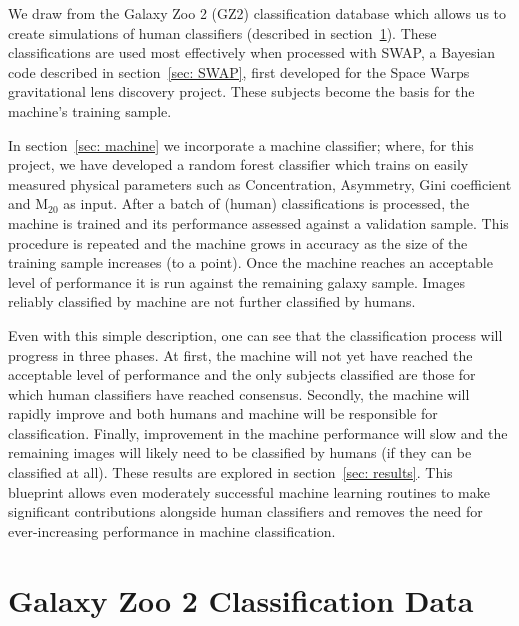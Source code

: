\documentclass[twocolumn]{aastex6}
\begin{document}
We draw from the Galaxy Zoo 2 (GZ2) classification database which allows us to 
 create simulations of human classifiers (described in section~\ref{sec: data}).
These classifications are used most effectively when processed with SWAP, 
a Bayesian code described in  section~\ref{sec: SWAP}, first developed for the 
Space Warps gravitational lens discovery project. 
These subjects become the basis for the machine's training sample. 

In section~\ref{sec: machine} we incorporate a machine classifier; where, for this
project, we have developed a random forest classifier which trains on easily measured 
physical parameters such as Concentration, Asymmetry, Gini coefficient and M$_{20}$ as input. 
After a batch of (human) classifications is processed,  the machine is trained and 
its performance assessed against a validation sample. This procedure is repeated and 
the machine grows in accuracy as the size of the training sample increases (to a point). 
Once the machine reaches an acceptable level of performance it is run against the 
remaining galaxy sample. Images reliably classified by machine are not further classified by humans.

Even with this simple description, one can see that the classification process 
will progress in three phases. At first, the machine will not yet have reached the 
acceptable level of performance and the only subjects classified
 are those for which human classifiers have reached consensus. 
Secondly, the machine will rapidly improve and both humans and machine will be 
responsible for classification. Finally, improvement in the machine performance 
will slow and the remaining images will likely need to be classified by humans (if they can be 
classified at all). These results are explored in section~\ref{sec: results}. 
This blueprint allows even moderately successful machine learning 
routines to make significant contributions alongside human classifiers and 
removes the need for ever-increasing performance in machine classification.



\section{Galaxy Zoo 2 Classification Data} \label{sec: data}
\end{document}
